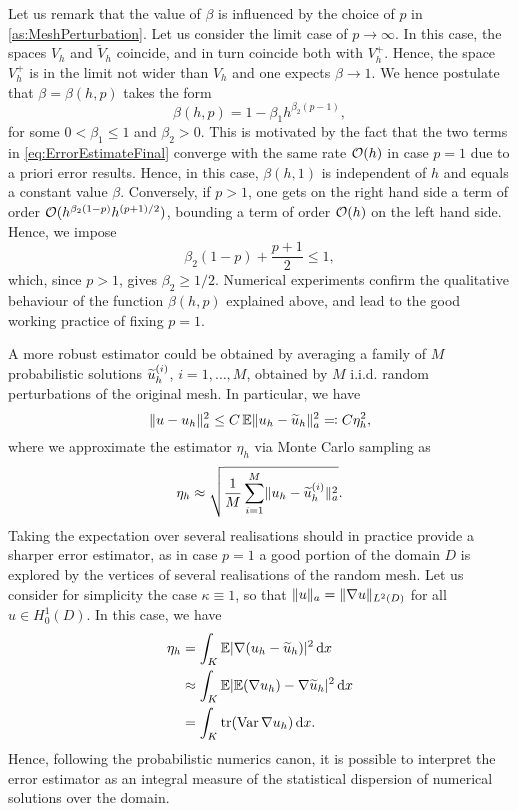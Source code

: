 \documentclass[10pt]{article}
\begin{document}
\begin{remark} Let us remark that the value of $\beta$ is influenced by the choice of $p$ in \cref{as:MeshPerturbation}. Let us consider the limit case of $p \to \infty$. In this case, the spaces $V_h$ and $\tilde V_h$ coincide, and in turn coincide both with $V_h^+$. Hence, the space $V_h^+$ is in the limit not wider than $V_h$ and one expects $\beta \to 1$. We hence postulate that $\beta = \beta(h, p)$ takes the form
	\begin{equation}
		\beta(h, p) = 1 - \beta_1 h^{\beta_2(p-1)},
	\end{equation}
	for some $0 < \beta_1 \leq 1$ and $\beta_2 > 0$. This is motivated by the fact that the two terms in \eqref{eq:ErrorEstimateFinal} converge with the same rate $\mathcal{O}(h)$ in case $p = 1$ due to a priori error results. Hence, in this case, $\beta(h, 1)$ is independent of $h$ and equals a constant value $\beta$. Conversely, if $p > 1$, one gets on the right hand side a term of order $\mathcal{O}(h^{\beta_2(1-p)} h^{(p+1)/2})$, bounding a term of order $\mathcal{O}(h)$ on the left hand side. Hence, we impose
	\begin{equation}
		\beta_2(1-p) + \frac{p+1}{2} \leq 1,
	\end{equation}
	which, since $p > 1$, gives $\beta_2 \geq 1/2$. Numerical experiments confirm the qualitative behaviour of the function $\beta(h, p)$ explained above, and lead to the good working practice of fixing $p = 1$.
\end{remark}

A more robust estimator could be obtained by averaging a family of $M$ probabilistic solutions $\widetilde u_h^{(i)}$, $i = 1, \ldots, M$, obtained by $M$ i.i.d. random perturbations of the original mesh. In particular, we have 
\begin{equation}
	\lVert u - u_h\rVert_a^2 \leq C \operatorname{\mathbb{E}} \lVert u_h - \widetilde u_h\rVert_a^2 \eqqcolon C \eta_h^2,
\end{equation}
where we approximate the estimator $\eta_h$ via Monte Carlo sampling as
\begin{equation}
	\eta_h \approx \sqrt{\frac{1}{M} \sum_{i=1}^M \lVert u_h - \widetilde u_h^{(i)}\rVert_a^2}.
\end{equation}
Taking the expectation over several realisations should in practice provide a sharper error estimator, as in case $p = 1$ a good portion of the domain $D$ is explored by the vertices of several realisations of the random mesh. Let us consider for simplicity the case $\kappa \equiv 1$, so that $\lVert u\rVert_a = \lVert\nabla u\rVert_{L^2(D)}$ for all $u \in H^1_0(D)$. In this case, we have
\begin{equation}
\begin{aligned}
	\eta_h &= \int_{K} \operatorname{\mathbb{E}} \lvert\nabla (u_h - \widetilde u_h)\rvert^2 \, \mathrm{d} x\\
		   &\approx \int_{K} \operatorname{\mathbb{E}} \lvert\operatorname{\mathbb{E}} (\nabla u_h) - \nabla \widetilde u_h\rvert^2 \, \mathrm{d} x\\
		   &= \int_K \operatorname{tr} (\operatorname{Var} \nabla u_h) \, \mathrm{d} x.
\end{aligned}
\end{equation}   
Hence, following the probabilistic numerics canon, it is possible to interpret the error estimator as an integral measure of the statistical dispersion of numerical solutions over the domain.
\end{document}
